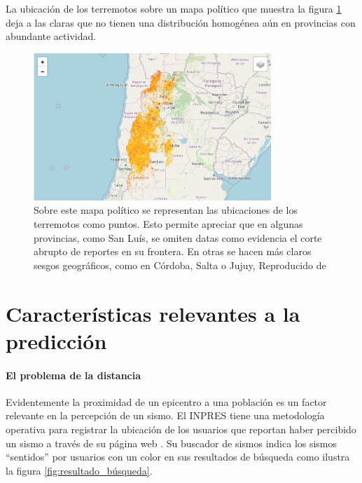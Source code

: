 \documentclass[a4paper]{report}
\begin{document}
La ubicación de los terremotos sobre un mapa político que muestra la figura \ref{fig:terremotosMapa} deja a las claras que no tienen una distribución homogénea aún en provincias con abundante actividad.
\begin{figure}[!ht]
\centering
\includegraphics[width=0.8\textwidth]{terremotosMapa.png}
\caption{Sobre este mapa político se representan las ubicaciones de los terremotos como puntos. Esto permite apreciar que en algunas provincias, como San Luís, se omiten datas como evidencia el corte abrupto de reportes en su frontera. En otras se hacen más claros sesgos geográficos, como en Córdoba, Salta o Jujuy, 
Reproducido de \cite{daniela_parada_ic-datasets-docencia_nodate}}
\label{fig:terremotosMapa}
\end{figure}






\section{Características relevantes a la predicción}

\paragraph{El problema de la distancia}
Evidentemente la proximidad de un epicentro a una población es un factor relevante en la percepción de un sismo.
El INPRES tiene una metodología operativa para registrar la ubicación de los usuarios que reportan haber percibido un sismo a través de su página web \cite{noauthor_acerca_nodate}.
Su buscador de sismos indica los sismos ``sentidos'' por usuarios con un color en sus resultados de búsqueda como ilustra la figura \ref{fig:resultado_búsqueda}.
\end{document}
